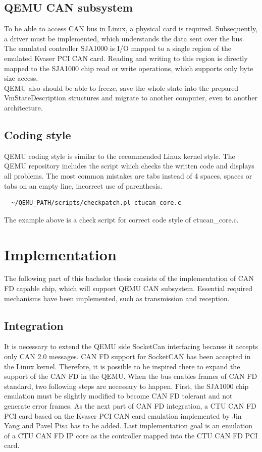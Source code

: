 \documentclass{ctuthesis}
\begin{document}
 \section{QEMU CAN subsystem}
  To be able to access CAN bus in Linux, a physical card is required. Subsequently, a driver must be implemented, which understands the data sent over the bus. \\
  The emulated controller SJA1000 is I/O mapped to a single region of the emulated Kvaser PCI CAN card. Reading and writing to this region is directly mapped to the SJA1000 chip read or write operations, which supports only byte size access. \\
  QEMU also should be able to freeze, save the whole state into the prepared VmStateDescription structures and migrate to another computer, even to another architecture. \\

 \section{Coding style}
  QEMU coding style \cite{qemu-style} is similar to the recommended Linux kernel style.  The QEMU repository includes the script which checks the written code and displays all problems. The most common mistakes are tabs instead of 4 spaces, spaces or tabs on an empty line, incorrect use of parenthesis.
  \begin{verbatim}  ~/QEMU_PATH/scripts/checkpatch.pl ctucan_core.c\end{verbatim}
  The example above is a check script for correct code style of ctucan\_core.c.

 
\chapter{Implementation}
 The following part of this bachelor thesis consists of the implementation of CAN FD capable chip, which will support QEMU CAN subsystem. Essential required mechanisms have been implemented, such as transmission and reception.  
 \section{Integration}
  It is necessary to extend the QEMU side SocketCan interfacing because it accepts only CAN 2.0 messages. CAN FD support for SocketCAN has been accepted in the Linux kernel. Therefore, it is possible to be inspired there to expand the support of the CAN FD in the QEMU. When the bus enables frames of CAN FD standard, two following steps are necessary to happen. First, the SJA1000 chip emulation must be slightly modified to become CAN FD tolerant and not generate error frames. As the next part of CAN FD integration, a CTU CAN FD PCI card based on the Kvaser PCI CAN card emulation implemented by Jin Yang and Pavel Pisa has to be added. Last implementation goal is an emulation of a CTU CAN FD IP core as the controller mapped into the CTU CAN FD PCI card.
\end{document}
